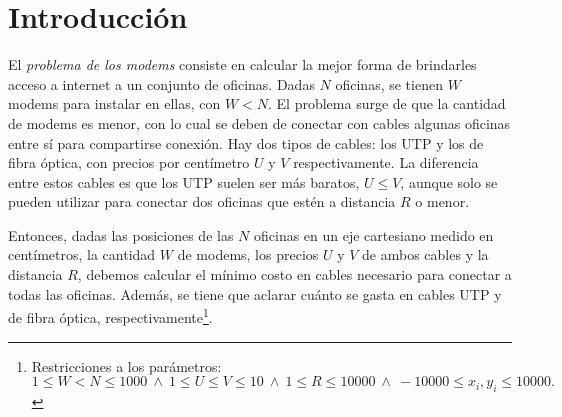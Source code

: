 \section{Introducción}

El \textit{problema de los modems} consiste en calcular la mejor forma de brindarles acceso a internet a un conjunto de oficinas. Dadas $N$ oficinas, se tienen $W$ modems para instalar en ellas, con $W < N$. El problema surge de que la cantidad de modems es menor, con lo cual se deben de conectar con cables algunas oficinas entre sí para compartirse conexión. Hay dos tipos de cables: los UTP y los de fibra óptica, con precios por centímetro $U$ y $V$ respectivamente. La diferencia entre estos cables es que los UTP suelen ser más baratos, $U \leq V$, aunque solo se pueden utilizar para conectar dos oficinas que estén a distancia $R$ o menor.

\vspace{1em}

Entonces, dadas las posiciones de las $N$ oficinas en un eje cartesiano medido en centímetros, la cantidad $W$ de modems, los precios $U$ y $V$ de ambos cables y la distancia $R$, debemos calcular el mínimo costo en cables necesario para conectar a todas las oficinas. Además, se tiene que aclarar cuánto se gasta en cables UTP y de fibra óptica, respectivamente\footnote{Restricciones a los parámetros: \\ \indent \indent $1 \leq W < N \leq 1000 \ \wedge \ 1 \leq U \leq V \leq 10 \ \wedge \ 1 \leq R \leq 10000 \ \wedge \  -10000 \leq x_i, y_i \leq 10000. $}.

\vspace{1em}

